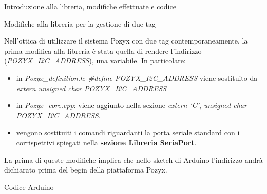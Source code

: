 \documentclass[12pt]{report}
\begin{document}
\begin{section}{Introduzione alla libreria, modifiche effettuate e codice}
		\begin{subsection}{Modifiche alla libreria per la gestione di due tag}

			Nell’ottica di utilizzare il sistema Pozyx con due tag contemporaneamente, la prima modifica alla libreria è stata quella di rendere l’indirizzo (\textit{POZYX\_I2C\_ADDRESS}), una variabile. In particolare:

			\begin{itemize}
				\item in \textit{Pozyx\_definition.h}: \textit{\#define POZYX\_I2C\_ADDRESS} viene sostituito da \textit{extern unsigned char POZYX\_I2C\_ADDRESS}
				\item in \textit{Pozyx\_core.cpp}: viene aggiunto nella sezione \textit{extern ‘C’}, \textit{unsigned char POZYX\_I2C\_ADDRESS}.
				\item vengono sostituiti i comandi riguardanti la porta seriale standard con i corrispettivi spiegati nella \hyperlink{S2}{\textbf{sezione Libreria SeriaPort}}.
			\end{itemize}
			La prima di queste modifiche implica che nello sketch di Arduino l’indirizzo andrà dichiarato prima del begin della piattaforma Pozyx.

		\end{subsection}

		\begin{subsection}{Codice Arduino}


\end{subsection}
\end{section}
\end{document}
